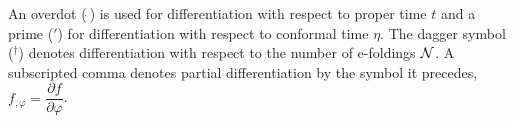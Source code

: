An overdot ($\dot{~}$) is used for differentiation with respect to proper
time $t$ and a prime ($'$) for differentiation with respect to conformal time
$\eta$. The dagger symbol ($^\dagger$) denotes differentiation with respect to the
number of e-foldings $\mathcal{N}$.
% 
A subscripted comma denotes partial differentiation by the symbol it
precedes, \eg $f_{,\varphi} = \dfrac{\partial f}{\partial \varphi}$.


